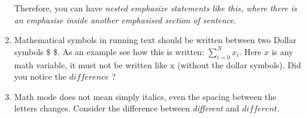\documentclass{article}
\begin{document}
\begin{enumerate}
  Therefore, you can have \emph{nested emphasize statements like this,
  where there is an emphasise 
  \emph{inside another}  emphasised section of sentence}.

 
\item Mathematical symbols in running text should be written between
two Dollar symbols \$  \$.  As an example see how this is written:
$\sum_{i=0}^{N} x_i $.  Here $x$ is any math variable, it must not
be written like x (without the dollar symbols). Did you notice the
$difference$ ?


\item Math mode does not mean simply italics, even the spacing between
the letters changes.  Consider the difference between
\emph{different} and $different$.


\end{enumerate}
\end{document}
